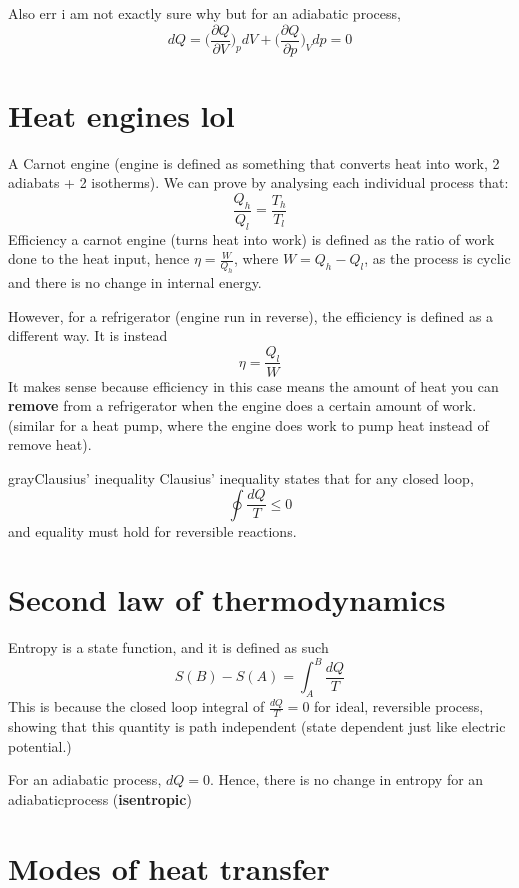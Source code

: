 Also err i am not exactly sure why but for an adiabatic process,
\begin{equation}
    dQ=\bigg(\frac{\partial Q}{\partial V}\bigg)_p dV + \bigg(\frac{\partial Q}{\partial p}\bigg)_V dp=0
\end{equation}

\section{Heat engines lol}
A Carnot engine (engine is defined as something that converts heat into work, 2 adiabats + 2 isotherms). We can prove by analysing each individual process that:
\begin{equation}
    \frac{Q_h}{Q_l}=\frac{T_h}{T_l}
\end{equation}
Efficiency a carnot engine (turns heat into work) is defined as the ratio of work done to the heat input, hence $\eta=\frac{W}{Q_h}$, where $W=Q_h-Q_l$, as the process is cyclic and there is no change in internal energy.

\begin{flushleft}
    However, for a refrigerator (engine run in reverse), the efficiency is defined as a different way. It is instead
    \begin{equation}
        \eta=\frac{Q_l}{W}
    \end{equation}
    It makes sense because efficiency in this case means the amount of heat you can \textbf{remove} from a refrigerator when the engine does a certain amount of work. (similar for a heat pump, where the engine does work to pump heat instead of remove heat).
\end{flushleft}

\begin{mybox}{gray}{Clausius' inequality}
    Clausius' inequality states that for any closed loop,
    \begin{equation}
        \oint \frac{dQ}{T} \leq 0
    \end{equation}
    and equality must hold for reversible reactions.
\end{mybox}

\section{Second law of thermodynamics}
Entropy is a state function, and it is defined as such
\begin{equation}
    S(B)-S(A)=\int_A^B \frac{dQ}{T}
\end{equation}
This is because the closed loop integral of $\frac{dQ}{T}=0$ for ideal, reversible process, showing that this quantity is path independent (state dependent just like electric potential.)

\begin{flushleft}
    For an adiabatic process, $dQ=0$. Hence, there is no change in entropy for an adiabaticprocess (\textbf{isentropic})
\end{flushleft}
\section{Modes of heat transfer}